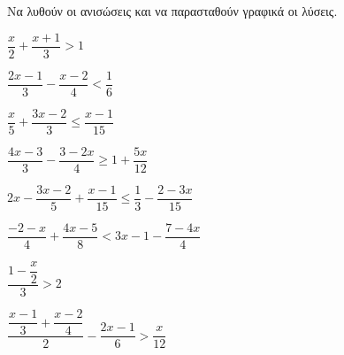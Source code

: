 \documentclass[11pt,a4paper]{article}
\begin{document}
Να λυθούν οι ανισώσεις και να παρασταθούν γραφικά οι λύσεις.
\begin{multicols}{2}
\begin{alist}
\item $ \dfrac{x}{2}+\dfrac{x+1}{3}>1 $
\item $ \dfrac{2x-1}{3}-\dfrac{x-2}{4}<\dfrac{1}{6} $
\item $ \dfrac{x}{5}+\dfrac{3x-2}{3}\leq\dfrac{x-1}{15} $
\item $ \dfrac{4x-3}{3}-\dfrac{3-2x}{4}\geq1+\dfrac{5x}{12} $
\vfill
\columnbreak
\vfill
\item $ 2x-\dfrac{3x-2}{5}+\dfrac{x-1}{15}\leq\dfrac{1}{3}-\dfrac{2-3x}{15} $
\item $ \dfrac{-2-x}{4}+\dfrac{4x-5}{8}<3x-1-\dfrac{7-4x}{4} $
\item $ \dfrac{1-\dfrac{x}{2}}{3}>2 $
\item $ \dfrac{\dfrac{x-1}{3}+\dfrac{x-2}{4}}{2}-\dfrac{2x-1}{6}>\dfrac{x}{12} $
\end{alist}
\end{multicols}
\end{document}
